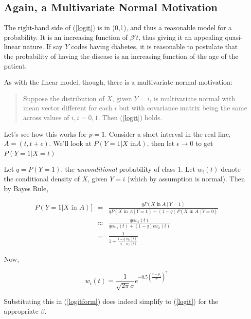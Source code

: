 \subsection{Again, a Multivariate Normal Motivation}

The right-hand side of (\ref{logit}) is in (0,1), and thus a reasonable
model for a probability.  It is an increasing function of $\beta't$,
thus giving it an appealing quasi-linear nature.  If say $Y$ codes
having diabetes, it is reasonable to postulate that the probability of
having the disease is an increasing function of the age of the patient.

As with the linear model, though, there is a multivariate normal
motivation:

\begin{quote}
Suppose the distribution of $X$, given $Y = i$, is multivariate normal
with mean vector different for each $i$ but with covariance matrix being
the same across values of $i, i = 0,1$.  Then (\ref{logit}) holds.
\end{quote}

Let's see how this works for $p = 1$.  Consider a short interval in the
real line, $A = (t,t+\epsilon)$.  We'll look at $P(Y = 1 | X \textrm{ in
} A)$, then let $\epsilon \rightarrow 0$ to get $P(Y = 1 | X = t)$

Let $q = P(Y = 1)$, the \textit{unconditional} probability of class 1.
Let $w_i(t)$ denote the conditional density of $X$, given $Y = i$ (which
by assumption is normal).  Then by Bayes Rule,

\begin{eqnarray}
P(Y = 1 | X \textrm{ in } A) [&=& 
\frac
{q P(X \textrm{ in } A ~|~  Y = 1)}
{
{q P(X \textrm{ in } A ~|~ Y = 1)} +
(1-q) P(X \textrm{ in } A ~|~ Y = 0) 
} \\
&\approx&  
\frac{q \epsilon w_1(t)}
{q \epsilon w_1(t) + (1-q) \epsilon w_0(t)} \\
&=& 
\label{logitform}
\frac{1}{1 + \frac{1-q}{a} \frac{w_0(t)}{w_1(t)}}
\end{eqnarray}

Now, 

\begin{equation}
w_i(t) = 
\frac{1}{\sqrt{2 \pi} \sigma}
e^{-0.5 \left ( \frac{t-\mu_i}{\sigma} \right )^2}
\end{equation}

Substituting this in (\ref{logitform}) does indeed simplify to
(\ref{logit}) for the appropriate $\beta$.

